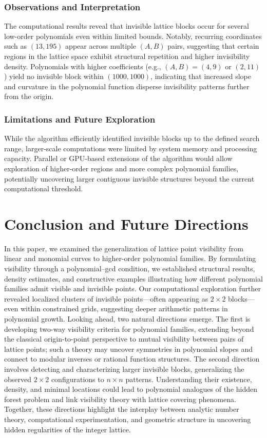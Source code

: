 \documentclass[12pt, reqno]{amsart}
\theoremstyle{definition}
\theoremstyle{remark}
\numberwithin{equation}{section}
\begin{document}
\subsubsection{Observations and Interpretation}
The computational results reveal that invisible lattice blocks occur for several low-order polynomials even within limited bounds. Notably, recurring coordinates such as $(13,195)$ appear across multiple $(A,B)$ pairs, suggesting that certain regions in the lattice space exhibit structural repetition and higher invisibility density.  
Polynomials with higher coefficients (e.g., $(A,B) = (4,9)$ or $(2,11)$) yield no invisible block within $(1000,1000)$, indicating that increased slope and curvature in the polynomial function disperse invisibility patterns further from the origin. 

\subsubsection{Limitations and Future Exploration}
While the algorithm efficiently identified invisible blocks up to the defined search range, larger-scale computations were limited by system memory and processing capacity. Parallel or GPU-based extensions of the algorithm would allow exploration of higher-order regions and more complex polynomial families, potentially uncovering larger contiguous invisible structures beyond the current computational threshold.

\section{Conclusion and Future Directions}
In this paper, we examined the generalization of lattice point visibility from linear and monomial curves to higher-order polynomial families. By formulating visibility through a polynomial--gcd condition, we established structural results, density estimates, and constructive examples illustrating how different polynomial families admit visible and invisible points. Our computational exploration further revealed localized clusters of invisible points---often appearing as \(2\times 2\) blocks---even within constrained grids, suggesting deeper arithmetic patterns in polynomial growth. Looking ahead, two natural directions emerge. The first is developing two-way visibility criteria for polynomial families, extending beyond the classical origin-to-point perspective to mutual visibility between pairs of lattice points; such a theory may uncover symmetries in polynomial slopes and connect to modular inverses or rational function structures. The second direction involves detecting and characterizing larger invisible blocks, generalizing the observed \(2\times 2\) configurations to \(n\times n\) patterns. Understanding their existence, density, and minimal locations could lead to polynomial analogues of the hidden forest problem and link visibility theory with lattice covering phenomena. Together, these directions highlight the interplay between analytic number theory, computational experimentation, and geometric structure in uncovering hidden regularities of the integer lattice.
\clearpage
\appendix
\end{document}
